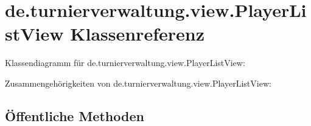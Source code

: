 \hypertarget{classde_1_1turnierverwaltung_1_1view_1_1_player_list_view}{}\section{de.\+turnierverwaltung.\+view.\+Player\+List\+View Klassenreferenz}
\label{classde_1_1turnierverwaltung_1_1view_1_1_player_list_view}


Klassendiagramm für de.\+turnierverwaltung.\+view.\+Player\+List\+View\+:


Zusammengehörigkeiten von de.\+turnierverwaltung.\+view.\+Player\+List\+View\+:
\subsection*{Öffentliche Methoden}
